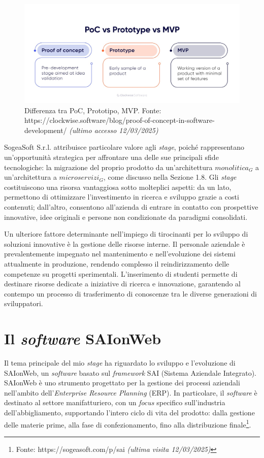     \begin{figure}[H]
        \centering
        \includegraphics[width=0.6\linewidth]{BCS-Tessi/images/PoC_MVP.jpeg}
        \caption[Differenza tra PoC, Prototipo, MVP]{Differenza tra PoC, Prototipo, MVP. Fonte: https://clockwise.software/blog/proof-of-concept-in-software-development/ \textit{(ultimo accesso 12/03/2025)}}
        \label{fig:PoC-prototipo-MVP}
    \end{figure}

    \vspace{0.2 em}
    \noindent SogeaSoft S.r.l. attribuisce particolare valore agli \textit{stage}, poiché rappresentano un'opportunità strategica per affrontare una delle sue principali sfide tecnologiche: la migrazione del proprio prodotto da un’architettura $monolitica_G$ a un’architettura a $microservizi_G$, come discusso nella Sezione 1.8. Gli \textit{stage} costituiscono una risorsa vantaggiosa sotto molteplici aspetti: da un lato, permettono di ottimizzare l’investimento in ricerca e sviluppo grazie a costi contenuti; dall’altro, consentono all’azienda di entrare in contatto con prospettive innovative, idee originali e persone non condizionate da paradigmi consolidati. 

    \vspace{0.2 em}
    \noindent Un ulteriore fattore determinante nell’impiego di tirocinanti per lo sviluppo di soluzioni innovative è la gestione delle risorse interne. Il personale aziendale è prevalentemente impegnato nel mantenimento e nell’evoluzione dei sistemi attualmente in produzione, rendendo complesso il reindirizzamento delle competenze su progetti sperimentali. L’inserimento di studenti permette di destinare risorse dedicate a iniziative di ricerca e innovazione, garantendo al contempo un processo di trasferimento di conoscenze tra le diverse generazioni di sviluppatori.
    
    \section{Il \textit{software} SAIonWeb}
    
    Il tema principale del mio \textit{stage} ha riguardato lo sviluppo e l’evoluzione di SAIonWeb, un \textit{software} basato sul \textit{framework} SAI (Sistema Aziendale Integrato). SAIonWeb è uno strumento progettato per la gestione dei processi aziendali nell’ambito dell’\textit{Enterprise Resource Planning} (ERP). In particolare, il \textit{software} è destinato al settore manifatturiero, con un \textit{focus} specifico sull'industria dell’abbigliamento, supportando l'intero ciclo di vita del prodotto: dalla gestione delle materie prime, alla fase di confezionamento, fino alla distribuzione finale\footnote{Fonte: https://sogeasoft.com/p/sai \textit{(ultima visita 12/03/2025)}}. 

